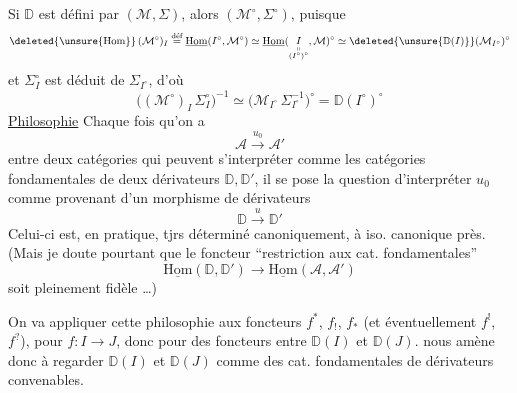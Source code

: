 Si $\mathbb D$ est défini par $(\mathcal M,\Sigma)$, alors  $(\mathcal M^\circ,\Sigma^\circ)$, puisque
\[
\deleted{\unsure{\mathrm{Hom}}}\,(\mathcal M^\circ)_I\overset{\text{déf}}{=}
\underline{\mathrm{Hom}}(I^\circ,\mathcal M^\circ)\simeq
\underline{\mathrm{Hom}}(\underset{\substack{\shortparallel\\(I^\circ)^\circ}}{I},\mathcal M)^\circ
\simeq\deleted{\unsure{\mathbb D(I)}}(\mathcal M_{I^\circ})^\circ
\]
et $\Sigma^\circ_I$ est déduit de $\Sigma_{I^\circ}$,  d'où
\[
\big((\mathcal M^\circ)_I\,\Sigma^\circ_I\big)^{-1}\simeq
\big(\mathcal M_{I^\circ}\,\Sigma_{I^\circ}^{-1}\big)^\circ=\mathbb D(I^\circ)^\circ
\]
\uline{Philosophie} Chaque fois qu'on a  
\[
\mathcal A\xrightarrow{u_0}\mathcal A'
\]
entre deux catégories qui peuvent s'interpréter  comme les catégories fondamentales de deux dérivateurs $\mathbb D,\mathbb D'$, il se pose la question d'interpréter $u_0$ comme provenant d'un morphisme de dérivateurs
\[
\mathbb D\xrightarrow{u}\mathbb D'
\]
Celui-ci est, en pratique, tjrs déterminé canoniquement, à iso. canonique près. (Mais je doute pourtant que le foncteur ``restriction aux cat. fondamentales''
\[
\underline{\mathrm{Hom}}(\mathbb D,\mathbb D')\longrightarrow\underline{\mathrm{Hom}}(\mathcal A,\mathcal A')
\]
soit pleinement fidèle \ldots)

On va appliquer cette philosophie aux foncteurs $f^*$, $f_!$, $f_*$ (et éventuellement $f^!$, $f^?$), pour $f:I\longrightarrow J$, donc pour des foncteurs entre $\mathbb D(I)$ et $\mathbb D(J)$.  nous amène donc à regarder $\mathbb D(I)$ et $\mathbb D(J)$ comme des cat. fondamentales de dérivateurs convenables.

